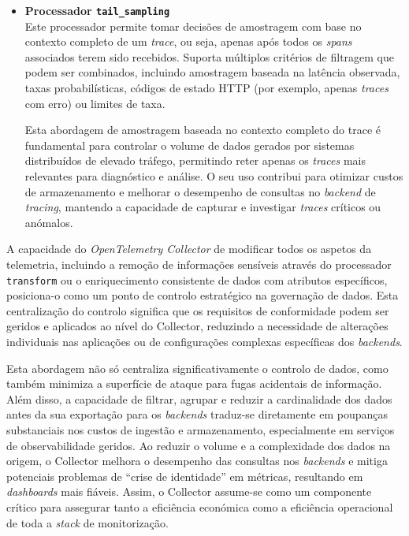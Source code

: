 \begin{itemize}
\item \textbf{Processador \texttt{tail\_sampling}}\\

Este processador permite tomar decisões de amostragem com base no contexto completo de um \textit{trace}, ou seja, apenas após todos os \textit{spans} associados terem sido recebidos. Suporta múltiplos critérios de filtragem que podem ser combinados, incluindo amostragem baseada na latência observada, taxas probabilísticas, códigos de estado HTTP (por exemplo, apenas \textit{traces} com erro) ou limites de taxa. 

Esta abordagem de amostragem baseada no contexto completo do trace é fundamental para controlar o volume de dados gerados por sistemas distribuídos de elevado tráfego, permitindo reter apenas os \textit{traces} mais relevantes para diagnóstico e análise. O seu uso contribui para otimizar custos de armazenamento e melhorar o desempenho de consultas no \textit{backend} de \textit{tracing}, mantendo a capacidade de capturar e investigar \textit{traces} críticos ou anómalos.

\end{itemize}

A capacidade do \textit{OpenTelemetry Collector} de modificar todos os aspetos da telemetria, incluindo a remoção de informações sensíveis através do processador \texttt{transform} ou o enriquecimento consistente de dados com atributos específicos, posiciona-o como um ponto de controlo estratégico na governação de dados. Esta centralização do controlo significa que os requisitos de conformidade podem ser geridos e aplicados ao nível do Collector, reduzindo a necessidade de alterações individuais nas aplicações ou de configurações complexas específicas dos \textit{backends}.

Esta abordagem não só centraliza significativamente o controlo de dados, como também minimiza a superfície de ataque para fugas acidentais de informação. Além disso, a capacidade de filtrar, agrupar e reduzir a cardinalidade dos dados antes da sua exportação para os \textit{backends} traduz-se diretamente em poupanças substanciais nos custos de ingestão e armazenamento, especialmente em serviços de observabilidade geridos. Ao reduzir o volume e a complexidade dos dados na origem, o Collector melhora o desempenho das consultas nos \textit{backends} e mitiga potenciais problemas de ``crise de identidade'' em métricas, resultando em \textit{dashboards} mais fiáveis. Assim, o Collector assume-se como um componente crítico para assegurar tanto a eficiência económica como a eficiência operacional de toda a \textit{stack} de monitorização.



